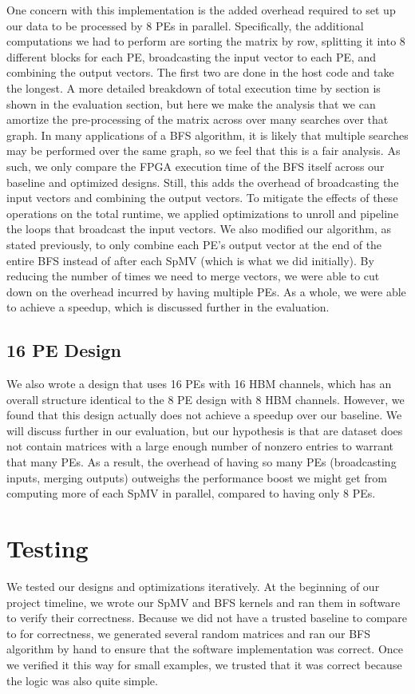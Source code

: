 \documentclass[10pt]{article}
\begin{document}
\noindent One concern with this implementation is the added overhead required to set up
our data to be processed by 8 PEs in parallel. Specifically, the additional
computations we had to perform are sorting the matrix by row, splitting it into
8 different blocks for each PE, broadcasting the input vector to each PE, and
combining the output vectors. The first two are done in the host code and take
the longest. A more detailed breakdown of total execution time by section is
shown in the evaluation section, but here we make the analysis that we can
amortize the pre-processing of the matrix across over many searches over that
graph. In many applications of a BFS algorithm, it is likely that multiple
searches may be performed over the same graph, so we feel that this is a fair
analysis. As such, we only compare the FPGA execution time of the BFS itself
across our baseline and optimized designs. Still, this adds the overhead of
broadcasting the input vectors and combining the output vectors. To mitigate the
effects of these operations on the total runtime, we applied optimizations to
unroll and pipeline the loops that broadcast the input vectors. We also modified our algorithm,
as stated previously, to only combine each PE's output vector at the end of the entire BFS instead
of after each SpMV (which is what we did initially). By reducing the number of times we need to merge
vectors, we were able to cut down on the overhead incurred by having multiple PEs. As a whole, we 
were able to achieve a speedup, which is discussed further in the evaluation.

\subsection{16 PE Design}
\noindent We also wrote a design that uses 16 PEs with 16 HBM channels, which has an overall structure
identical to the 8 PE design with 8 HBM channels. However, we found that this design actually does
not achieve a speedup over our baseline. We will discuss further in our
evaluation, but our hypothesis is that are dataset does not contain matrices
with a large enough number of nonzero entries to warrant that many PEs. As a
result, the overhead of having so many PEs (broadcasting inputs, merging
outputs) outweighs the performance boost we might get from computing more of
each SpMV in parallel, compared to having only 8 PEs.

\section{Testing}
\noindent We tested our designs and optimizations iteratively. At the beginning of our project timeline, we 
wrote our SpMV and BFS kernels and ran them in software to verify their correctness. Because we did not
have a trusted baseline to compare to for correctness, we generated several random matrices and 
ran our BFS algorithm by hand to ensure that the software implementation was correct. Once we verified
it this way for small examples, we trusted that it was correct because the logic was also quite simple. \newline
\end{document}
